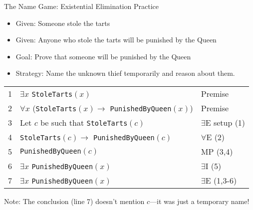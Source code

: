 \documentclass{beamer}
\begin{document}
	\begin{frame}{The Name Game: Existential Elimination Practice}
		\begin{itemize}
			\item Given: Someone stole the tarts
			\item Given: Anyone who stole the tarts will be punished by the Queen
			\item Goal: Prove that someone will be punished by the Queen
			\item Strategy: Name the unknown thief temporarily and reason about them.
		\end{itemize}
		
		\begin{example}
			\footnotesize
			\begin{tabular}{|c|l|l|}
				\hline
				1 & $\exists x$ \texttt{StoleTarts}$(x)$ & Premise \\
				2 & $\forall x$ (\texttt{StoleTarts}$(x) \rightarrow$ \texttt{PunishedByQueen}$(x)$) & Premise \\
				\hline
				3 & \quad Let $c$ be such that \texttt{StoleTarts}$(c)$ & $\exists$E setup (1) \\
				4 & \quad \texttt{StoleTarts}$(c) \rightarrow$ \texttt{PunishedByQueen}$(c)$ & $\forall$E (2) \\
				5 & \quad \texttt{PunishedByQueen}$(c)$ & MP (3,4) \\
				6 & \quad $\exists x$ \texttt{PunishedByQueen}$(x)$ & $\exists$I (5) \\
				\hline
				7 & $\exists x$ \texttt{PunishedByQueen}$(x)$ & $\exists$E (1,3-6) \\
				\hline
			\end{tabular}
			
			Note: The conclusion (line 7) doesn't mention $c$—it was just a temporary name!
		\end{example}
	\end{frame}
	
\end{document}
